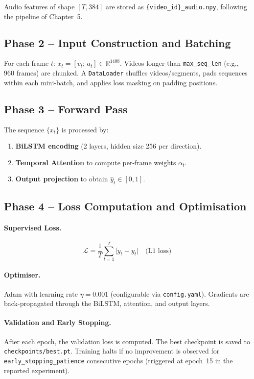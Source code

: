 \documentclass[12pt, a4paper]{report}
\begin{document}
Audio features of shape $[T, 384]$ are stored as
\texttt{\{video\_id\}\_audio.npy}, following the pipeline of Chapter~5.

\subsection{Phase 2 -- Input Construction and Batching}

For each frame $t$: $x_t = [v_t;\, a_t] \in \mathbb{R}^{1408}$.
Videos longer than \texttt{max\_seq\_len} (e.g., 960 frames) are chunked.
A \texttt{DataLoader} shuffles videos/segments, pads sequences within each
mini-batch, and applies loss masking on padding positions.

\subsection{Phase 3 -- Forward Pass}

The sequence $\{x_t\}$ is processed by:
\begin{enumerate}
  \item \textbf{BiLSTM encoding} (2 layers, hidden size 256 per direction).
  \item \textbf{Temporal Attention} to compute per-frame weights $\alpha_t$.
  \item \textbf{Output projection} to obtain $\hat{y}_t \in [0,1]$.
\end{enumerate}

\subsection{Phase 4 -- Loss Computation and Optimisation}

\paragraph{Supervised Loss.}
\begin{equation}
  \mathcal{L} = \frac{1}{T} \sum_{t=1}^{T} \bigl|\hat{y}_t - y_t\bigr|
  \quad \text{(L1 loss)}
\end{equation}

\paragraph{Optimiser.}
Adam with learning rate $\eta = 0.001$ (configurable via \texttt{config.yaml}).
Gradients are back-propagated through the BiLSTM, attention, and output layers.

\paragraph{Validation and Early Stopping.}
After each epoch, the validation loss is computed. The best checkpoint is saved to
\texttt{checkpoints/best.pt}. Training halts if no improvement is observed for
\texttt{early\_stopping\_patience} consecutive epochs (triggered at epoch~15 in
the reported experiment).
\end{document}
